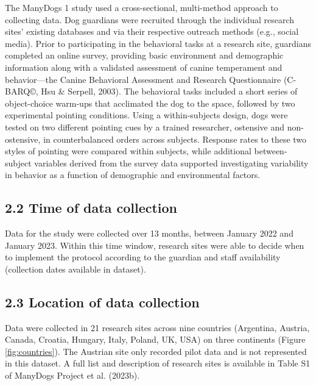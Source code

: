 \documentclass[
  man,floatsintext]{apa6}
\begin{document}
The ManyDogs 1 study used a cross-sectional, multi-method approach to collecting data. Dog guardians were recruited through the individual research sites' existing databases and via their respective outreach methods (e.g., social media). Prior to participating in the behavioral tasks at a research site, guardians completed an online survey, providing basic environment and demographic information along with a validated assessment of canine temperament and behavior---the Canine Behavioral Assessment and Research Questionnaire (C-BARQ©, Hsu \& Serpell, 2003). The behavioral tasks included a short series of object-choice warm-ups that acclimated the dog to the space, followed by two experimental pointing conditions. Using a within-subjects design, dogs were tested on two different pointing cues by a trained researcher, ostensive and non-ostensive, in counterbalanced orders across subjects. Response rates to these two styles of pointing were compared within subjects, while additional between-subject variables derived from the survey data supported investigating variability in behavior as a function of demographic and environmental factors.

\hypertarget{time-of-data-collection}{%
\subsection{2.2 Time of data collection}\label{time-of-data-collection}}

Data for the study were collected over 13 months, between January 2022 and January 2023. Within this time window, research sites were able to decide when to implement the protocol according to the guardian and staff availability (collection dates available in dataset).

\hypertarget{location-of-data-collection}{%
\subsection{2.3 Location of data collection}\label{location-of-data-collection}}

Data were collected in 21 research sites across nine countries (Argentina, Austria, Canada, Croatia, Hungary, Italy, Poland, UK, USA) on three continents (Figure \ref{fig:countries}). The Austrian site only recorded pilot data and is not represented in this dataset. A full list and description of research sites is available in Table S1 of ManyDogs Project et al. (2023b).
\end{document}
